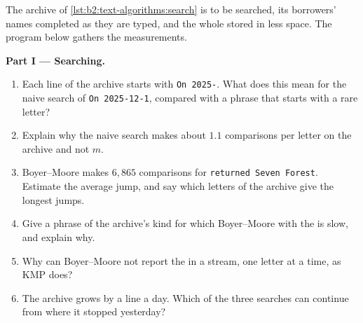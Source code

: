 \begin{problem}\label{pb:b2:text-algorithms:1}
The archive of \cref{lst:b2:text-algorithms:search} is to be searched, its borrowers' names completed as they are typed,
and the whole stored in less space. The program below gathers the measurements.

\label{out:b2:text-algorithms:problem}

\medskip\noindent\textbf{Part I --- Searching.}\par\nopagebreak
\begin{enumerate}
\item Each line of the archive starts with \texttt{On 2025-}. What does this mean for the naive search of
\texttt{On 2025-12-1}, compared with a phrase that starts with a rare letter?
\item Explain why the naive search makes about $1.1$ comparisons per letter on the archive and not $m$.
\item Boyer--Moore makes $6{,}865$ comparisons for \texttt{returned Seven Forest}. Estimate the average jump, and say
which letters of the archive give the longest jumps.
\item Give a phrase of the archive's kind for which Boyer--Moore with the  is slow, and explain why.
\item Why can Boyer--Moore not report the  in a stream, one letter at a time, as KMP does?
\item The archive grows by a line a day. Which of the three searches can continue from where it stopped yesterday?
\end{enumerate}


\end{problem}
